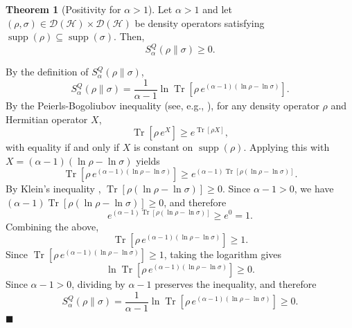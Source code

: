 \documentclass[a4paper, amsfonts, amssymb, amsmath, reprint, showkeys, nofootinbib, twoside, aps, pra]{revtex4-2}
\theoremstyle{definition}
\newtheorem{theorem}{Theorem}
\renewenvironment{proof}{\noindent{\bfseries Proof.}}{\hfill$\blacksquare$}
\begin{document}
\begin{theorem}[Positivity for $\alpha > 1$]
Let $\alpha > 1$ and let
$(\rho,\sigma) \in \mathcal{D}(\mathcal{H}) \times \mathcal{D}(\mathcal{H})$
be density operators satisfying
$\operatorname{supp}(\rho)\subseteq\operatorname{supp}(\sigma)$.
Then,
\begin{equation}
    S_\alpha^{Q}(\rho\|\sigma) \ge 0.
\end{equation}
\end{theorem}

\begin{proof}
By the definition of $S^Q_\alpha(\rho\|\sigma)$,
\begin{equation}
    S_\alpha^{Q}(\rho\|\sigma)
    =\frac{1}{\alpha-1}\ln \operatorname{Tr}\!\left[
    \rho\, e^{(\alpha-1)(\ln\rho-\ln\sigma)}\right].
\end{equation}
By the Peierls-Bogoliubov inequality 
(see, e.g., \cite{Wehrl1978GeneralEntropy,bhatia1997matrix}), 
for any density operator $\rho$ and Hermitian operator $X$,
\begin{equation}
\operatorname{Tr}[\rho\, e^{X}] \ge e^{\operatorname{Tr}[\rho X]},
\end{equation}
with equality if and only if $X$ is constant on $\operatorname{supp}(\rho)$.
Applying this with $X = (\alpha-1)(\ln\rho-\ln\sigma)$ yields
\begin{equation}
\operatorname{Tr}\!\left[\rho\, e^{(\alpha-1)(\ln\rho-\ln\sigma)}\right]
\ge 
e^{(\alpha-1)\operatorname{Tr}[\rho(\ln\rho-\ln\sigma)]}.
\end{equation}
By Klein's inequality \cite{bhatia1997matrix,Carlen2010}, $\operatorname{Tr}[\rho(\ln\rho-\ln\sigma)] \ge 0$.
Since $\alpha - 1 > 0$, we have
$(\alpha-1)\operatorname{Tr}[\rho(\ln\rho-\ln\sigma)] \ge 0$,
and therefore
\begin{equation}
e^{(\alpha-1)\operatorname{Tr}[\rho(\ln\rho-\ln\sigma)]} \ge e^0 = 1.
\end{equation}
Combining the above,
\begin{equation}
\operatorname{Tr}\!\left[
\rho\, e^{(\alpha-1)(\ln\rho-\ln\sigma)}
\right] \ge 1.
\end{equation}
Since $\operatorname{Tr}[\rho\, e^{(\alpha-1)(\ln\rho-\ln\sigma)}] \ge 1$,
taking the logarithm gives
\begin{equation}
\ln\operatorname{Tr}\!\left[\rho\, e^{(\alpha-1)(\ln\rho-\ln\sigma)}\right] \ge 0.
\end{equation}
Since $\alpha - 1 > 0$, dividing by $\alpha - 1$ preserves the inequality,
and therefore
\begin{equation}
S^Q_\alpha(\rho\|\sigma) 
= \frac{1}{\alpha-1}
\ln\operatorname{Tr}\!\left[\rho\, e^{(\alpha-1)(\ln\rho-\ln\sigma)}\right]
\ge 0.
\end{equation}
\end{proof}
\end{document}
